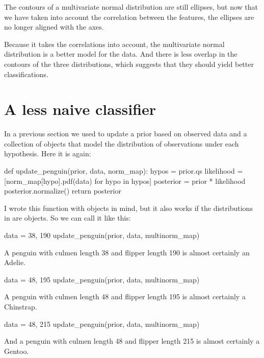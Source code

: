 \documentclass[12pt]{book}
\theoremstyle{exercise}
\begin{document}
The contours of a multivariate normal distribution are still ellipses,
but now that we have taken into account the correlation between the
features, the ellipses are no longer aligned with the axes.

Because it takes the correlations into account, the multivariate normal
distribution is a better model for the data. And there is less overlap
in the contours of the three distributions, which suggests that they
should yield better classifications.

\section{A less naive classifier}
\label{a-less-naive-classifier}

In a previous section we used 
to update a prior  based on observed data
and a collection of  objects that model
the distribution of observations under each hypothesis. Here it is
again:

\begin{code}
def update_penguin(prior, data, norm_map):
    hypos = prior.qs
    likelihood = [norm_map[hypo].pdf(data) for hypo in hypos]
    posterior = prior * likelihood
    posterior.normalize()
    return posterior
\end{code}

I wrote this function with  objects in
mind, but it also works if the distributions in
 are
 objects. So we can call
it like this:

\begin{code}
data = 38, 190
update_penguin(prior, data, multinorm_map)
\end{code}

A penguin with culmen length 38 and flipper length 190 is almost
certainly an Adelie.

\begin{code}
data = 48, 195
update_penguin(prior, data, multinorm_map)
\end{code}

A penguin with culmen length 48 and flipper length 195 is almost
certainly a Chinstrap.

\begin{code}
data = 48, 215
update_penguin(prior, data, multinorm_map)
\end{code}

And a penguin with culmen length 48 and flipper length 215 is almost
certainly a Gentoo.
\end{document}
